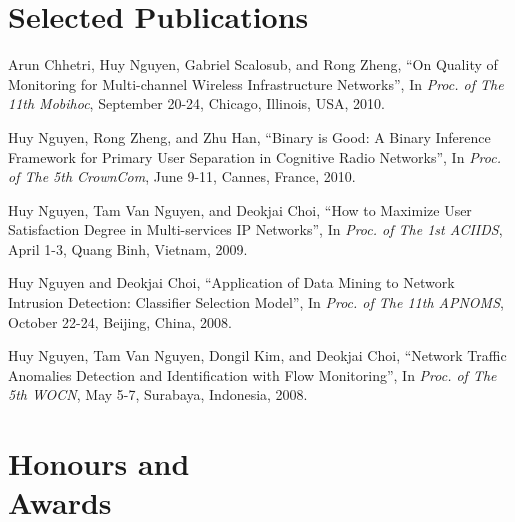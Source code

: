 \documentclass[margin,line]{resume}
\begin{document}
\begin{resume}
    \section{\mysidestyle Selected Publications}

    Arun Chhetri, Huy Nguyen, Gabriel Scalosub, and Rong Zheng,
    ``On Quality of Monitoring for Multi-channel Wireless Infrastructure Networks'',
    In \textsl{Proc. of The 11th Mobihoc}, September 20-24, Chicago, Illinois, USA, 2010.

    \vspace{-2mm}
    Huy Nguyen, Rong Zheng, and Zhu Han,
    ``Binary is Good: A Binary Inference Framework for Primary User Separation in Cognitive Radio Networks'',
    In \textsl{Proc. of The 5th CrownCom}, June 9-11, Cannes, France, 2010.

    \vspace{-2mm}
    Huy Nguyen, Tam Van Nguyen, and Deokjai Choi,
    ``How to Maximize User Satisfaction Degree in Multi-services IP Networks'',
    In \textsl{Proc. of The 1st ACIIDS}, April 1-3, Quang Binh, Vietnam, 2009.

    \vspace{-2mm}
    Huy Nguyen and Deokjai Choi,
    ``Application of Data Mining to Network Intrusion Detection: Classifier Selection Model'',
    In \textsl{Proc. of The 11th APNOMS}, October 22-24, Beijing, China, 2008.

    \vspace{-2mm}
    Huy Nguyen, Tam Van Nguyen, Dongil Kim, and Deokjai Choi,
    ``Network Traffic Anomalies Detection and Identification with Flow Monitoring'',
    In \textsl{Proc. of The 5th WOCN}, May 5-7, Surabaya, Indonesia, 2008.\\\vspace{-5mm}


    \section{\mysidestyle Honours and\\Awards}


\end{resume}
\end{document}
